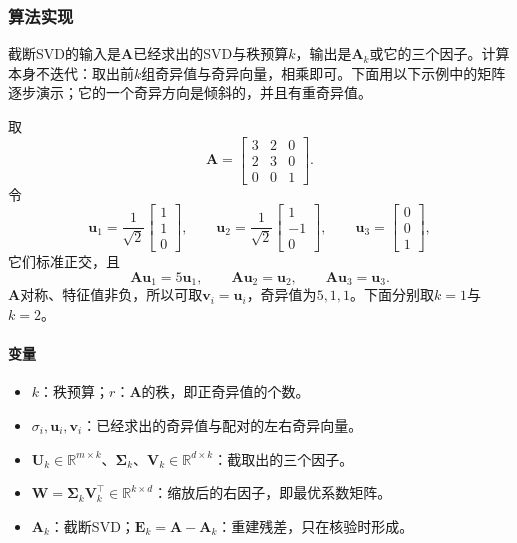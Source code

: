 \subsubsection{算法实现}

截断SVD的输入是$\bm A$已经求出的SVD与秩预算$k$，输出是$\bm A_k$或它的三个因子。计算本身不迭代：取出前$k$组奇异值与奇异向量，相乘即可。下面用以下示例中的矩阵逐步演示；它的一个奇异方向是倾斜的，并且有重奇异值。

\begin{example}[有重奇异值的三阶截断]
\label{ex:matrix-approximation-truncated-three-by-three}
取
\[
 \bm A=\begin{bmatrix}3&2&0\\2&3&0\\0&0&1\end{bmatrix}.
\]
令
\[
 \bm u_1=\frac1{\sqrt2}\begin{bmatrix}1\\1\\0\end{bmatrix},\qquad
 \bm u_2=\frac1{\sqrt2}\begin{bmatrix}1\\-1\\0\end{bmatrix},\qquad
 \bm u_3=\begin{bmatrix}0\\0\\1\end{bmatrix},
\]
它们标准正交，且
\[
 \bm A\bm u_1=5\bm u_1,\qquad\bm A\bm u_2=\bm u_2,\qquad\bm A\bm u_3=\bm u_3 .
\]
$\bm A$对称、特征值非负，所以可取$\bm v_i=\bm u_i$，奇异值为$5,1,1$。下面分别取$k=1$与$k=2$。
\end{example}

\paragraph{变量}
\begin{itemize}
 \item $k$：秩预算；$r$：$\bm A$的秩，即正奇异值的个数。
 \item $\sigma_i,\bm u_i,\bm v_i$：已经求出的奇异值与配对的左右奇异向量。
 \item $\bm U_k\in\mathbb R^{m\times k}$、$\bm\Sigma_k$、$\bm V_k\in\mathbb R^{d\times k}$：截取出的三个因子。
 \item $\bm W=\bm\Sigma_k\bm V_k^\top\in\mathbb R^{k\times d}$：缩放后的右因子，即最优系数矩阵。
 \item $\bm A_k$：截断SVD；$\bm E_k=\bm A-\bm A_k$：重建残差，只在核验时形成。
\end{itemize}

